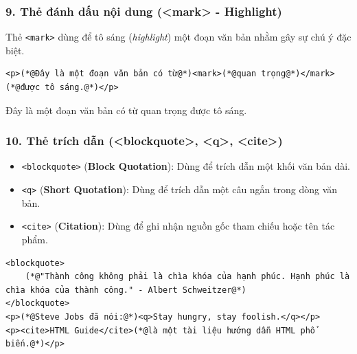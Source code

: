 \documentclass[11pt,oneside]{book}
\newcommand{\codeinline}[1]{\textcolor{accentOrange}{\texttt{#1}}}
\begin{document}
\subsubsection{9. Thẻ đánh dấu nội dung (<mark> - Highlight)}

Thẻ \codeinline{<mark>} dùng để tô sáng (\textit{highlight}) một đoạn văn bản nhằm gây sự chú ý đặc biệt.

\begin{codeWindow}
\begin{lstlisting}[language=HTML5]
<p>(*@Đây là một đoạn văn bản có từ@*)<mark>(*@quan trọng@*)</mark>(*@được tô sáng.@*)</p>
\end{lstlisting}
\end{codeWindow}

\begin{tcolorbox}[
    enhanced,
    colback=white,
    colframe=primaryBlue!20,
    arc=6pt,
    boxrule=0.8pt,
    drop shadow=black!3!white,
    top=8pt, bottom=8pt, left=12pt, right=12pt,
    title={\sffamily\bfseries\scriptsize\color{codeComment} KẾT QUẢ HIỂN THỊ TRÊN TRÌNH DUYỆT (BROWSER PREVIEW)},
    coltitle=codeComment,
    colbacktitle=codeBg!80!white
]
Đây là một đoạn văn bản có từ \colorbox{yellow!40}{quan trọng} được tô sáng.
\end{tcolorbox}


\subsubsection{10. Thẻ trích dẫn (<blockquote>, <q>, <cite>)}

\begin{itemize}[leftmargin=1.8em, itemsep=3pt, parsep=0pt]
    \item \codeinline{<blockquote>} (\textbf{Block Quotation}): Dùng để trích dẫn một khối văn bản dài.
    \item \codeinline{<q>} (\textbf{Short Quotation}): Dùng để trích dẫn một câu ngắn trong dòng văn bản.
    \item \codeinline{<cite>} (\textbf{Citation}): Dùng để ghi nhận nguồn gốc tham chiếu hoặc tên tác phẩm.
\end{itemize}

\begin{codeWindow}
\begin{lstlisting}[language=HTML5]
<blockquote>
    (*@"Thành công không phải là chìa khóa của hạnh phúc. Hạnh phúc là chìa khóa của thành công." - Albert Schweitzer@*)
</blockquote>
<p>(*@Steve Jobs đã nói:@*)<q>Stay hungry, stay foolish.</q></p>
<p><cite>HTML Guide</cite>(*@là một tài liệu hướng dẫn HTML phổ biến.@*)</p>
\end{lstlisting}
\end{codeWindow}
\end{document}
